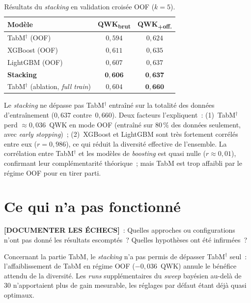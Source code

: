 \documentclass[conference]{IEEEtran}
\begin{document}
\begin{table}[htbp]
\caption{Résultats du \textit{stacking} en validation croisée OOF ($k=5$).}
\label{tab:stacking}
\centering
\begin{tabular}{lcc}
\toprule
\textbf{Modèle} & \textbf{QWK\textsubscript{brut}} &
\textbf{QWK\textsubscript{+off.}} \\
\midrule
TabM$^{\dagger}$ (OOF)                 & $0{,}594$          & $0{,}624$ \\
XGBoost (OOF)                          & $0{,}611$          & $0{,}635$ \\
LightGBM (OOF)                         & $0{,}607$          & $0{,}637$ \\
\textbf{Stacking}                      & $\mathbf{0{,}606}$ & $\mathbf{0{,}637}$ \\
\midrule
TabM$^{\dagger}$ (ablation, \textit{full train}) & $0{,}604$ & $\mathbf{0{,}660}$ \\
\bottomrule
\end{tabular}
\end{table}

Le \textit{stacking} ne dépasse pas TabM$^{\dagger}$ entraîné sur la totalité des données d'entraînement ($0{,}637$ contre~$0{,}660$). Deux facteurs l'expliquent~: (1)~TabM$^{\dagger}$ perd $\approx 0{,}036$~QWK en mode OOF (entraîné sur $80\,\%$ des données seulement, avec \textit{early stopping})~; (2)~XGBoost et LightGBM sont très fortement corrélés entre eux ($r=0{,}986$), ce qui réduit la diversité effective de l'ensemble. La corrélation entre TabM$^{\dagger}$ et les modèles de \textit{boosting} est quasi nulle ($r\approx 0{,}01$), confirmant leur complémentarité théorique~; mais TabM est trop affaibli par le régime OOF pour en tirer parti.

\section{Ce qui n'a pas fonctionné}

\textbf{[DOCUMENTER LES ÉCHECS]}~: Quelles approches ou configurations n'ont pas donné les résultats escomptés~? Quelles hypothèses ont été infirmées~?

Concernant la partie TabM, le \textit{stacking} n'a pas permis de dépasser TabM$^{\dagger}$ seul~: l'affaiblissement de TabM en régime OOF ($-0{,}036$~QWK) annule le bénéfice attendu de la diversité. Les \textit{runs} supplémentaires du \textit{sweep} bayésien au-delà de~$30$ n'apportaient plus de gain mesurable, les réglages par défaut étant déjà quasi optimaux.
\end{document}
